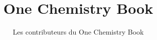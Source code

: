 \documentclass[11pt,a4paper,twoside,openany]{book}
\title{One Chemistry Book}
\author{Les contributeurs du One Chemistry Book}
\date{\bookdate}
\begin{document}
\frontmatter




\tableofcontents

\mainmatter



\appendix
\part{\omsolutionspart}


\backmatter
\renewcommand{\indexspace}{\par\vskip 8pt plus 4pt minus 4pt\relax}
\printindex
\end{document}
